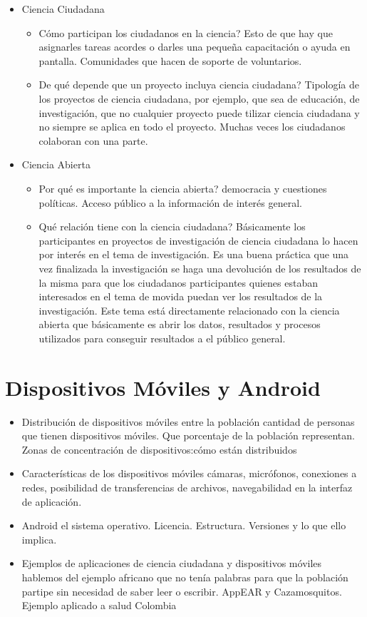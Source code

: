 \begin{itemize}
	\item Ciencia Ciudadana
	\begin{itemize}
		\item Cómo participan los ciudadanos en la ciencia?        
		Esto de que hay que asignarles tareas acordes o darles una pequeña capacitación o ayuda en pantalla. Comunidades que hacen de soporte de voluntarios.
		\item De qué depende que un proyecto incluya ciencia ciudadana?
		Tipología de los proyectos de ciencia ciudadana, por ejemplo, que sea de educación, de investigación, que no cualquier proyecto puede tilizar ciencia ciudadana y no siempre se aplica en todo el proyecto. Muchas veces los ciudadanos colaboran con una parte.
	\end{itemize}   
	\item Ciencia Abierta   
	\begin{itemize}
		\item Por qué es importante la ciencia abierta? democracia y cuestiones políticas. Acceso público a la información de interés general.
		\item Qué relación tiene con la ciencia ciudadana? Básicamente los participantes en proyectos de investigación de ciencia ciudadana lo hacen por interés en el tema de investigación. Es una buena práctica que una vez finalizada la investigación se haga una devolución de los resultados de la misma para que los ciudadanos participantes quienes estaban interesados en el tema de movida puedan ver los resultados de la investigación. Este tema está directamente relacionado con la ciencia abierta que básicamente es abrir los datos, resultados y procesos utilizados para conseguir resultados a el público general.
	\end{itemize}
\end{itemize}

\section{ Dispositivos Móviles y Android }
\begin{itemize}
	\item Distribución de dispositivos móviles entre la población
	cantidad de personas que tienen dispositivos móviles. Que porcentaje de la población representan. Zonas de concentración de dispositivos:cómo están distribuidos
	\item Características de los dispositivos móviles
	cámaras, micrófonos, conexiones a redes, posibilidad de transferencias de archivos, navegabilidad en la interfaz de aplicación.
	\item Android
	el sistema operativo. Licencia. Estructura. Versiones y lo que ello implica.
	\item Ejemplos de aplicaciones de ciencia ciudadana y dispositivos móviles
	hablemos del ejemplo africano que no tenía palabras para que la población partipe sin necesidad de saber leer o escribir. AppEAR y Cazamosquitos. Ejemplo aplicado a salud Colombia
\end{itemize}


